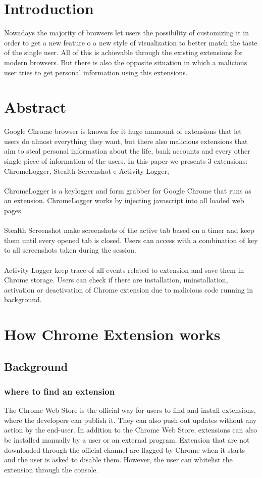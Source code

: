 \documentclass[12pt]{article}
\begin{document}
\begin{multicols}{2}
	\section*{Introduction}
	Nowadays the majority of browsers let users the possibility of customizing it in order to get a new feature o a new style of visualization to better match the taste of the single user.
	All of this is achievable through the existing extensions for modern browsers. But there is also the opposite situation in which a malicious user tries to get personal information using this extensions.
	
	\section*{Abstract}
	Google Chrome browser is known for it huge ammount of extensions that let users do almost everything they want, but there also malicious extensions that aim to steal personal information about the life, bank accounts and every other single piece of information of the users. In this paper we presents 3 extensions: ChromeLogger\cite{ChromeLogger}, Stealth Screenshot e Activity Logger;\\ \\
	ChromeLogger is a keylogger and form grabber for Google Chrome that runs as an extension.	
	ChromeLogger works by injecting javascript into all loaded web pages.\\ \\
	Stealth Screenshot make screenshots of the active tab based on a timer and keep them until every opened tab is closed. Users can access with a combination of key to all screenshots taken during the session.\\ \\
	Activity Logger keep trace of all events related to extension and save them in Chrome storage. Users can check if there are installation, uninstallation, activation or deactivation of Chrome extension due to malicious code running in background.
\section*{How Chrome Extension works}
\subsection*{Background}
\subsubsection*{where to find an extension}
The Chrome Web Store is the official way for users
to find and install extensions, where the developers can publish it. They can also push out updates without any action
by the end-user.
In addition to the Chrome Web Store, extensions can
also be installed manually by a user or an external program.
Extension that are not downloaded through the official channel are flagged by Chrome when it starts	and the user is asked to disable them.
However, the user can whitelist the extension through the console.

\end{multicols}
\end{document}

